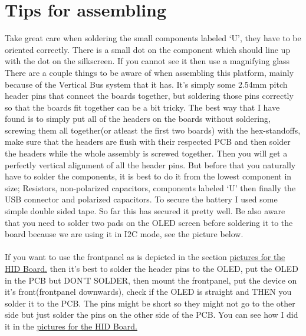 \documentclass{article}
\begin{document}
 \section{Tips for assembling}
 
{\color{red} Take great care when soldering the small components labeled `U', they have to be oriented correctly. There is a small dot on the component which should line up with the dot on the silkscreen. If you cannot see it then use a magnifying glass}
\newline\newline
 There are a couple things to be aware of when assembling this platform, mainly because of the Vertical Bus system that it has.
It's simply some 2.54mm pitch header pins that connect the boards together, but soldering those pins correctly so that the boards fit together can be a bit tricky. 
The best way that I have found is to simply put all of the headers on the boards without soldering, screwing them all together(or atleast the first two boards) with the hex-standoffs, make sure that the headers are flush with their respected PCB and then solder the headers while the whole assembly is screwed together. Then you will get a perfectly vertical alignment of all the header pins. 
 \newpage
But before that you naturally have to solder the components, it is best to do it from the lowest component in size; Resistors, non-polarized capacitors, components labeled `U' then finally the USB connector and polarized capacitors. 
\newline\newline
To secure the battery I used some simple double sided tape. So far this has secured it pretty well. 
{\color{red} Be also aware that you need to solder two pads on the OLED screen before soldering it to the board because we are using it in I2C mode}, see the picture below. \\\\ If you want to use the frontpanel as is depicted in the section \hyperref[fig:HIDpic]{pictures for the HID Board.} then it's best to solder the header pins to the OLED, put the OLED in the PCB but DON'T SOLDER, then mount the frontpanel, put the device on it's front(frontpanel downwards), check if the OLED is straight and THEN you solder it to the PCB. The pins might be short so they might not go to the other side but just solder the pins on the other side of the PCB. You can see how I did it in the \hyperref[fig:HIDpic]{pictures for the HID Board.}
\end{document}
